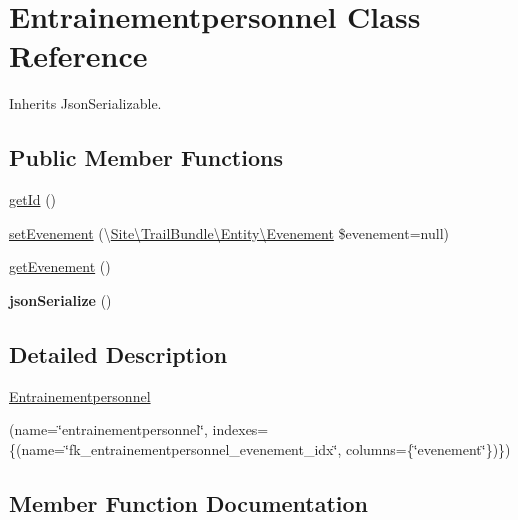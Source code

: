 \hypertarget{class_site_1_1_trail_bundle_1_1_entity_1_1_entrainementpersonnel}{}\section{Entrainementpersonnel Class Reference}
\label{class_site_1_1_trail_bundle_1_1_entity_1_1_entrainementpersonnel}


Inherits Json\+Serializable.

\subsection*{Public Member Functions}
\begin{DoxyCompactItemize}
\item 
\hyperlink{class_site_1_1_trail_bundle_1_1_entity_1_1_entrainementpersonnel_a12251d0c022e9e21c137a105ff683f13}{get\+Id} ()
\item 
\hyperlink{class_site_1_1_trail_bundle_1_1_entity_1_1_entrainementpersonnel_a6ed044dcb38f66a09b105075b59bd8ed}{set\+Evenement} (\textbackslash{}\hyperlink{class_site_1_1_trail_bundle_1_1_entity_1_1_evenement}{Site\textbackslash{}\+Trail\+Bundle\textbackslash{}\+Entity\textbackslash{}\+Evenement} \$evenement=null)
\item 
\hyperlink{class_site_1_1_trail_bundle_1_1_entity_1_1_entrainementpersonnel_a0d200fcb8e70d13b45e20baf2269ed3f}{get\+Evenement} ()
\item 
\hypertarget{class_site_1_1_trail_bundle_1_1_entity_1_1_entrainementpersonnel_ad402d8679325bc514874370f02b5c2ac}{}{\bfseries json\+Serialize} ()\label{class_site_1_1_trail_bundle_1_1_entity_1_1_entrainementpersonnel_ad402d8679325bc514874370f02b5c2ac}

\end{DoxyCompactItemize}


\subsection{Detailed Description}
\hyperlink{class_site_1_1_trail_bundle_1_1_entity_1_1_entrainementpersonnel}{Entrainementpersonnel}

(name=\char`\"{}entrainementpersonnel\char`\"{}, indexes=\{(name=\char`\"{}fk\+\_\+entrainementpersonnel\+\_\+evenement\+\_\+idx\char`\"{}, columns=\{\char`\"{}evenement\char`\"{}\})\})  

\subsection{Member Function Documentation}
\hypertarget{class_site_1_1_trail_bundle_1_1_entity_1_1_entrainementpersonnel_a0d200fcb8e70d13b45e20baf2269ed3f}{}
